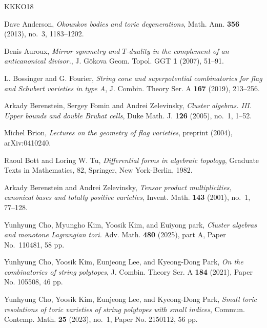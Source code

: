\documentclass[11pt]{amsart}
\theoremstyle{plain}
\theoremstyle{definition}
\theoremstyle{remark}
\numberwithin{equation}{section} \numberwithin{table}{section}
\numberwithin{equation}{section}
\begin{document}
%
%
\providecommand{\bysame}{\leavevmode\hbox to3em{\hrulefill}\thinspace}
\providecommand{\MR}{\relax\ifhmode\unskip\space\fi MR }
\providecommand{\MRhref}[2]{%
  \href{http://www.ams.org/mathscinet-getitem?mr=#1}{#2}
}
\providecommand{\href}[2]{#2}
\begin{thebibliography}{KKKO18}

Dave Anderson, \emph{Okounkov bodies and toric degenerations}, Math. Ann.
  \textbf{356} (2013), no.~3, 1183--1202. 

Denis Auroux, \emph{Mirror symmetry and $T$-duality in the complement of an anticanonical divisor.}, J. G\"{o}kova Geom. Topol. GGT \textbf{1} (2007), 51--91.

L. Bossinger and G. Fourier, \emph{String cone and superpotential combinatorics for flag and Schubert varieties in type A}, J. Combin. Theory Ser. A {\bf 167} (2019), 213--256.

Arkady Berenstein, Sergey Fomin and Andrei Zelevinsky, \emph{Cluster algebras. III. Upper bounds and double Bruhat cells}, Duke Math. J. {\bf 126} (2005), no.~1, 1--52.

Michel Brion, \emph{Lectures on the geometry of flag varieties}, preprint (2004), \href{https://arxiv.org/abs/math/0410240}{arXiv:0410240}.

Raoul Bott and Loring W. Tu, {\it Differential forms in algebraic topology}, Graduate Texts in Mathematics, 82, Springer, New York-Berlin, 1982.

Arkady Berenstein and Andrei Zelevinsky, \emph{Tensor product multiplicities, canonical bases and totally
  positive varieties}, Invent. Math. \textbf{143} (2001), no.~1, 77--128.

Yunhyung Cho, Myungho Kim, Yoosik Kim, and Euiyong park, \emph{Cluster algebras and monotone Lagrangian tori.} Adv. Math. \textbf{480} (2025), part A, Paper No.~110481, 58 pp.

Yunhyung Cho, Yoosik Kim, Eunjeong Lee, and Kyeong-Dong Park, \emph{On the combinatorics of string polytopes}, J. Combin. Theory Ser. A {\bf 184} (2021), Paper No. 105508, 46 pp.

Yunhyung Cho, Yoosik Kim, Eunjeong Lee, and Kyeong-Dong Park, \emph{Small toric resolutions of toric varieties of string polytopes with small indices}, Commun. Contemp. Math. {\bf 25} (2023), no.~1, Paper No. 2150112, 56 pp.


\end{thebibliography}
\end{document}

